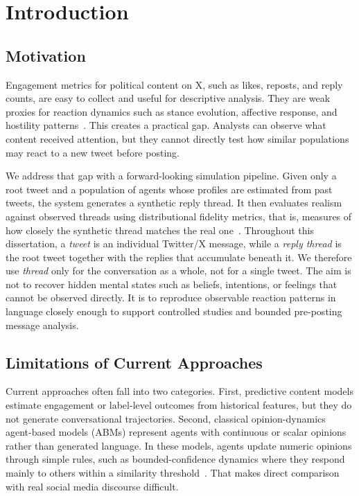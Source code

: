 \documentclass[logo,bsc,singlespacing,parskip,online]{infthesis}
\begin{document}
\chapter{Introduction}

\section{Motivation}
Engagement metrics for political content on X, such as likes, reposts, and reply counts, are easy to collect and useful for descriptive analysis. They are weak proxies for reaction dynamics such as stance evolution, affective response, and hostility patterns~\citep{diehl2016political,bozdag2025survey}. This creates a practical gap. Analysts can observe what content received attention, but they cannot directly test how similar populations may react to a new tweet before posting.

We address that gap with a forward-looking simulation pipeline. Given only a root tweet and a population of agents whose profiles are estimated from past tweets, the system generates a synthetic reply thread. It then evaluates realism against observed threads using distributional fidelity metrics, that is, measures of how closely the synthetic thread matches the real one~\citep{composta2025simulating,butler2024misinformation}. Throughout this dissertation, a \emph{tweet} is an individual Twitter/X message, while a \emph{reply thread} is the root tweet together with the replies that accumulate beneath it. We therefore use \emph{thread} only for the conversation as a whole, not for a single tweet. The aim is not to recover hidden mental states such as beliefs, intentions, or feelings that cannot be observed directly. It is to reproduce observable reaction patterns in language closely enough to support controlled studies and bounded pre-posting message analysis.

\section{Limitations of Current Approaches}
Current approaches often fall into two categories. First, predictive content models estimate engagement or label-level outcomes from historical features, but they do not generate conversational trajectories. Second, classical opinion-dynamics agent-based models (ABMs) represent agents with continuous or scalar opinions rather than generated language. In these models, agents update numeric opinions through simple rules, such as bounded-confidence dynamics where they respond mainly to others within a similarity threshold~\citep{deffuant2000mixing,hegselmann2002opinion}. That makes direct comparison with real social media discourse difficult.
\end{document}
